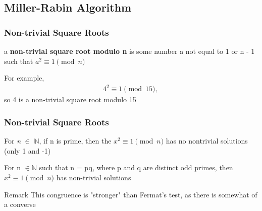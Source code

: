 \documentclass{beamer}
\begin{document}
\subsection{Miller-Rabin Algorithm}

\begin{frame}
\frametitle{Non-trivial Square Roots}
\begin{definition}
    a \textbf{non-trivial square root modulo n} is some number a not equal to 1 or n - 1 such that $a^2 \equiv 1 \pmod n$
\end{definition}

\begin{example}
    For example, 
    \begin{align*}
        4^2 \equiv 1 \pmod {15} \text{, }
    \end{align*}
    so 4 is a non-trivial square root modulo 15
\end{example}

\end{frame}

\begin{frame}
    
\frametitle{Non-trivial Square Roots}

\begin{theorem}
    For \textit{n} $\in$ $\mathbb{N}$, if n is prime, then the $x^2 \equiv 1 \pmod n$ has no nontrivial solutions (only 1 and -1)
\end{theorem}
\begin{theorem}
    For n $\in \mathbb{N}$ such that n = pq, where p and q are distinct odd primes, then $x^2 \equiv 1 \pmod n$ has non-trivial solutions
\end{theorem}
\begin{block}{Remark}
    This congruence is "stronger" than Fermat's test, as there is somewhat of a converse
\end{block}
\end{frame}
\end{document}
